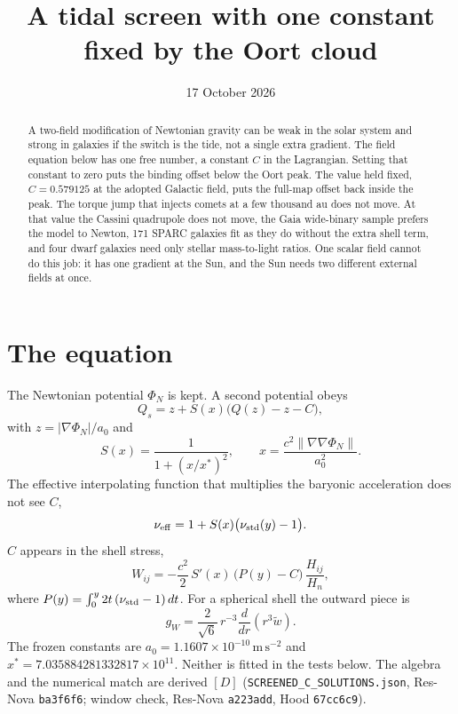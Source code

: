 \documentclass[11pt]{article}
\title{A tidal screen with one constant fixed by the Oort cloud}
\date{17 October 2026}
\begin{document}
\maketitle

\begin{abstract}
A two-field modification of Newtonian gravity can be weak in the solar system and strong in galaxies if the switch is the tide, not a single extra gradient. The field equation below has one free number, a constant \(C\) in the Lagrangian. Setting that constant to zero puts the binding offset below the Oort peak. The value held fixed, \(C = 0.579125\) at the adopted Galactic field, puts the full-map offset back inside the peak. The torque jump that injects comets at a few thousand au does not move. At that value the Cassini quadrupole does not move, the Gaia wide-binary sample prefers the model to Newton, 171 SPARC galaxies fit as they do without the extra shell term, and four dwarf galaxies need only stellar mass-to-light ratios. One scalar field cannot do this job: it has one gradient at the Sun, and the Sun needs two different external fields at once.
\end{abstract}

\section{The equation}

The Newtonian potential \(\Phi_N\) is kept. A second potential obeys
\begin{equation}
Q_s = z + S(x)\bigl(Q(z) - z - C\bigr),
\label{eq:qs}
\end{equation}
with \(z = |\nabla\Phi_N|/a_0\) and
\[
S(x) = \frac{1}{1+(x/x^*)^2}, \qquad
x = \frac{c^2 \|\nabla\nabla\Phi_N\|}{a_0^2}.
\]
The effective interpolating function that multiplies the baryonic acceleration does not see \(C\),
\begin{equation}
\nu_{\rm eff} = 1 + S(x)\bigl(\nu_{\rm std}(y) - 1\bigr).
\label{eq:nueff}
\end{equation}
\(C\) appears in the shell stress,
\begin{equation}
W_{ij} = -\frac{c^2}{2}\, S'(x)\, \bigl(P(y) - C\bigr)\, \frac{H_{ij}}{H_n},
\label{eq:W}
\end{equation}
where \(P(y) = \int_0^y 2t\,(\nu_{\rm std}-1)\,dt\). For a spherical shell the outward piece is
\[
g_W = \frac{2}{\sqrt{6}}\, r^{-3}\frac{d}{dr}(r^3 \tilde w).
\]
The frozen constants are \(a_0 = 1.1607\times 10^{-10}\,\mathrm{m\,s^{-2}}\) and \(x^* = 7.035884281332817\times 10^{11}\). Neither is fitted in the tests below. The algebra and the numerical match are derived \([D]\) (\texttt{SCREENED\_C\_SOLUTIONS.json}, Res-Nova \texttt{ba3f6f6}; window check, Res-Nova \texttt{a223add}, Hood \texttt{67cc6c9}).
\end{document}
